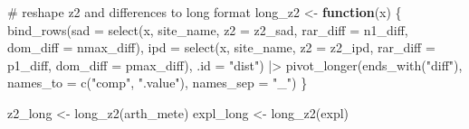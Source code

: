 \documentclass[
  letterpaper,
  DIV=11,
  numbers=noendperiod]{scrartcl}
\newenvironment{Shaded}{\begin{snugshade}}{\end{snugshade}}
\newcommand{\AttributeTok}[1]{\textcolor[rgb]{0.40,0.45,0.13}{#1}}
\newcommand{\CommentTok}[1]{\textcolor[rgb]{0.37,0.37,0.37}{#1}}
\newcommand{\ControlFlowTok}[1]{\textcolor[rgb]{0.00,0.23,0.31}{\textbf{#1}}}
\newcommand{\FunctionTok}[1]{\textcolor[rgb]{0.28,0.35,0.67}{#1}}
\newcommand{\NormalTok}[1]{\textcolor[rgb]{0.00,0.23,0.31}{#1}}
\newcommand{\OtherTok}[1]{\textcolor[rgb]{0.00,0.23,0.31}{#1}}
\newcommand{\SpecialCharTok}[1]{\textcolor[rgb]{0.37,0.37,0.37}{#1}}
\newcommand{\StringTok}[1]{\textcolor[rgb]{0.13,0.47,0.30}{#1}}
\begin{document}
\begin{Shaded}
\begin{Highlighting}[]
\CommentTok{\# reshape z2 and differences to long format}
\NormalTok{long\_z2 }\OtherTok{\textless{}{-}} \ControlFlowTok{function}\NormalTok{(x) \{}
    \FunctionTok{bind\_rows}\NormalTok{(}\AttributeTok{sad =} \FunctionTok{select}\NormalTok{(x, site\_name, }
                           \AttributeTok{z2 =}\NormalTok{ z2\_sad, }\AttributeTok{rar\_diff =}\NormalTok{ n1\_diff, }
                           \AttributeTok{dom\_diff =}\NormalTok{ nmax\_diff),}
              \AttributeTok{ipd =} \FunctionTok{select}\NormalTok{(x, site\_name, }
                           \AttributeTok{z2 =}\NormalTok{ z2\_ipd, }\AttributeTok{rar\_diff =}\NormalTok{ p1\_diff, }
                           \AttributeTok{dom\_diff =}\NormalTok{ pmax\_diff),}
              \AttributeTok{.id =} \StringTok{"dist"}\NormalTok{) }\SpecialCharTok{|\textgreater{}} 
        \FunctionTok{pivot\_longer}\NormalTok{(}\FunctionTok{ends\_with}\NormalTok{(}\StringTok{"diff"}\NormalTok{), }
                     \AttributeTok{names\_to =} \FunctionTok{c}\NormalTok{(}\StringTok{"comp"}\NormalTok{, }\StringTok{".value"}\NormalTok{), }
                     \AttributeTok{names\_sep =} \StringTok{"\_"}\NormalTok{)}
\NormalTok{\}}

\NormalTok{z2\_long }\OtherTok{\textless{}{-}} \FunctionTok{long\_z2}\NormalTok{(arth\_mete)}
\NormalTok{expl\_long }\OtherTok{\textless{}{-}} \FunctionTok{long\_z2}\NormalTok{(expl)}


\end{Highlighting}
\end{Shaded}
\end{document}

